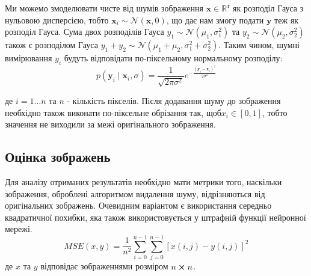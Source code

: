 \documentclass[14pt,a4paper]{extarticle}
\newcounter{e}
\numberwithin{equation}{section}
\numberwithin{figure}{section}
\begin{document}
	Ми можемо змоделювати чисте від шумів зображення $\mathbf{x} \in \mathbb{R}^{т}$ як розподіл Гауса з нульовою дисперсією, тобто $\mathbf{x}_{i} \sim \mathcal{N}(\mathbf{x}, 0)$, що дає нам змогу подати $\mathbf{y}$ теж як розподіл Гауса. Сума двох розподілів Гауса $y_{1} \sim \mathcal{N}\left(\mu_{1}, \sigma_{1}^{2}\right)$ та $y_{2} \sim \mathcal{N}\left(\mu_{2}, \sigma_{2}^{2}\right)$ також є розподілом Гауса $y_{1}+y_{2} \sim \mathcal{N}\left(\mu_{1}+\mu_{2}, \sigma_{1}^{2}+\sigma_{2}^{2}\right)$. Таким чином, шумні  вимірювання $y_{i}$ будуть відповідати по-піксельному нормальному розподілу:
	\begin{equation}
		p\left(\mathbf{y}_{i} \mid \mathbf{x}_{i}, 		\sigma\right)=\frac{1}{\sqrt{2 \pi \sigma^{2}}} e^{-\frac{\left(\mathbf{y}_{i}-\mathbf{x}_{i}\right)^{2}}{2 \sigma^{2}}}
	\end{equation}
	
	де $i = 1\dotsc n$ та $n$ - кількість пікселів. Після додавання шуму до зображення необхідно також виконати по-піксельне обрізання так, щоб$x_i \in [0, 1]$, тобто значення не виходили за межі оригінального зображення.
	
	\subsection{Оцінка зображень}
	Для аналізу отриманих результатів необхідно мати метрики того, наскільки зображення, оброблені алгоритмом видалення шуму,  відрізняються від оригінальних зображень. Очевидним варіантом є використання середньо квадратичної похибки, яка також використовується у штрафній функції нейронної мережі.
	\begin{equation}
		M S E(x, y) =\frac{1}{n^2} \sum_{i=0}^{n-1} \sum_{j=0}^{n-1}[x(i, j)-y(i, j)]^{2}
	\end{equation}
	де $x$ та $y$ відповідає зображеннями розміром $n \cross n$.
	
\end{document}
